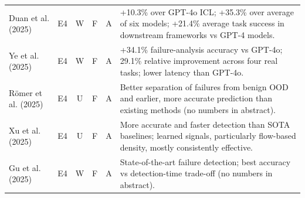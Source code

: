 \documentclass[10pt,a4paper]{article}
\begin{document}
\begin{longtable}{@{}>{\raggedright\arraybackslash}p{4.0cm}cccc>{\raggedright\arraybackslash}p{7.6cm}@{}}
Duan et al. (2025)~\cite{Duan2025} & E4 & W & F & A & +10.3\% over GPT-4o ICL; +35.3\% over average of six models; +21.4\% average task success in downstream frameworks vs GPT-4 models. \\
Ye et al. (2025)~\cite{Ye2025} & E4 & W & F & A & +34.1\% failure-analysis accuracy vs GPT-4o; 29.1\% relative improvement across four real tasks; lower latency than GPT-4o. \\
R\"omer et al. (2025)~\cite{Romer2025} & E4 & U & F & A & Better separation of failures from benign OOD and earlier, more accurate prediction than existing methods (no numbers in abstract). \\
Xu et al. (2025)~\cite{Xu2025} & E4 & U & F & A & More accurate and faster detection than SOTA baselines; learned signals, particularly flow-based density, mostly consistently effective. \\
Gu et al. (2025)~\cite{Gu2025} & E4 & W & F & A & State-of-the-art failure detection; best accuracy vs detection-time trade-off (no numbers in abstract). \\
\bottomrule\end{longtable}
\end{document}
